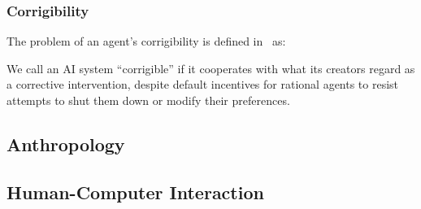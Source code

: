 \subsubsection{Corrigibility}
The problem of an agent's corrigibility is defined in~\cite{corrigibility} as:

\begin{displayquote}
We call an AI system “corrigible” if it cooperates with what its creators regard as a corrective intervention, despite default incentives for rational agents to resist attempts to shut them down or modify their preferences.
\end{displayquote}



\subsection{Anthropology}


\subsection{Human-Computer Interaction} %
